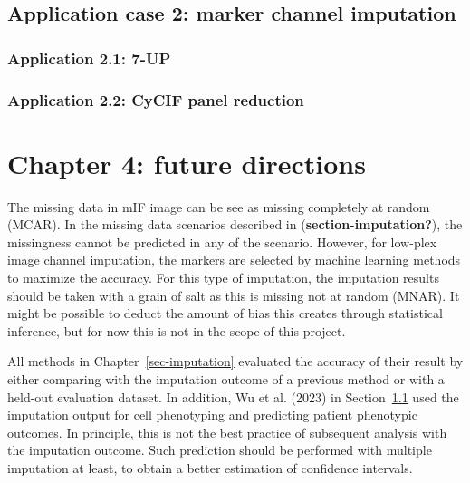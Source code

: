 \documentclass[
  letterpaper,
  DIV=11,
  numbers=noendperiod,
  oneside]{scrreprt}
\begin{document}
\hypertarget{application-case-2-marker-channel-imputation}{%
\section{Application case 2: marker channel
imputation}\label{application-case-2-marker-channel-imputation}}

\hypertarget{sec-imputation2}{%
\subsection{Application 2.1: 7-UP}\label{sec-imputation2}}

\hypertarget{sec-imputation3}{%
\subsection{Application 2.2: CyCIF panel
reduction}\label{sec-imputation3}}


\hypertarget{chapter-4-future-directions}{%
\chapter{Chapter 4: future
directions}\label{chapter-4-future-directions}}

The missing data in mIF image can be see as missing completely at random
(MCAR). In the missing data scenarios described in
(\textbf{section-imputation?}), the missingness cannot be predicted in
any of the scenario. However, for low-plex image channel imputation, the
markers are selected by machine learning methods to maximize the
accuracy. For this type of imputation, the imputation results should be
taken with a grain of salt as this is missing not at random (MNAR). It
might be possible to deduct the amount of bias this creates through
statistical inference, but for now this is not in the scope of this
project.

All methods in Chapter~\ref{sec-imputation} evaluated the accuracy of
their result by either comparing with the imputation outcome of a
previous method or with a held-out evaluation dataset. In addition, Wu
et al. (2023) in Section~\ref{sec-imputation2} used the imputation
output for cell phenotyping and predicting patient phenotypic outcomes.
In principle, this is not the best practice of subsequent analysis with
the imputation outcome. Such prediction should be performed with
multiple imputation at least, to obtain a better estimation of
confidence intervals.
\end{document}
